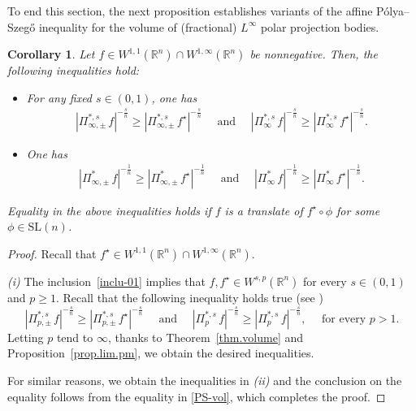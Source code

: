 \documentclass[11pt, reqno]{article}
\newtheorem{corollary}[theorem]{Corollary}
\theoremstyle{definition}
\numberwithin{equation}{section}
\newcommand{\R}{\mathbb{R}}
\begin{document}
To end this section, the next proposition establishes variants of the affine P\'olya--Szeg\H{o} inequality for the volume of (fractional) $L^\infty$ polar projection bodies.

\begin{corollary}
Let $f \in W^{1, 1}(\R^n) \cap W^{1, \infty}(\R^n)$ be nonnegative.
Then, the following inequalities hold:
	\begin{itemize}
		\item[(i)] For any fixed $s \in (0, 1)$, one has
			\begin{align*}
				| \Pi^{\ast,s}_{\infty, \pm} \, f|^{- \frac{s}{n}} \geq  | \Pi^{\ast,s}_{\infty, \pm} \, f^\star |^{- \frac{s}{n}} \quad \text{ and } \quad | \Pi^{\ast,s}_{\infty} \, f|^{- \frac{s}{n}} \geq  | \Pi^{\ast,s}_{\infty} \, f^\star |^{- \frac{s}{n}}.
			\end{align*}
		
		\item[(ii)] One has
			\begin{align*}
				| \Pi^{\ast}_{\infty, \pm} \, f|^{- \frac{1}{n}} \geq  | \Pi^{\ast}_{\infty, \pm} \, f^\star |^{- \frac{1}{n}} \quad \text{ and } \quad | \Pi^{\ast}_{\infty} \, f|^{- \frac{1}{n}} \geq  | \Pi^{\ast}_{\infty} \, f^\star |^{- \frac{1}{n}}.
			\end{align*}		
	\end{itemize}		

Equality in the above inequalities holds if $f$ is a translate of $f^\star \circ \phi$ for some $\phi \in \mathrm{SL}(n)$.
\end{corollary}

\begin{proof}
Recall that $f^\star \in W^{1, 1}(\R^n) \cap W^{1, \infty}(\R^n)$.

\medskip

\textit{(i)}
The inclusion~\eqref{inclu-01} implies that $f, f^\star \in W^{s, p}(\R^n)$ for every $s \in (0, 1)$ and $p \geq 1$.
Recall that the following inequality holds true (see \cite[Theorem 13--14]{HL_2024})
\begin{equation}\label{PS-vol}
    | \Pi^{\ast, s}_{p, \pm } \, f|^{- \frac{s}{n}} \geq |\Pi^{\ast, s}_{p, \pm} \, f^\star|^{-\frac{s}{n}} \quad \text{ and } \quad | \Pi^{\ast, s}_p \, f |^{- \frac{s}{n}} \geq |\Pi^{\ast, s}_p \, f|^{-\frac{s}{n}}, \quad \text{ for every $p > 1$}.
\end{equation}
Letting $p$ tend to $\infty$, thanks to Theorem~\ref{thm.volume} and Proposition~\ref{prop.lim.pm}, we obtain the desired inequalities.

\medskip

For similar reasons, we obtain the inequalities in \textit{(ii)} and the conclusion on the equality follows from the equality in \eqref{PS-vol}, which completes the proof.
\end{proof}
\end{document}
